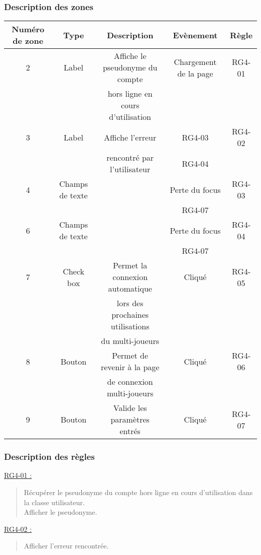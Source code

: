 \documentclass{report}
\begin{document}
		\subsubsection{Description des zones}
		
			\begin{tabular}{|c|c|c|c|c|} \hline
				Numéro de zone & Type  & Description & Evènement &	Règle \\\hline
				2 & Label & Affiche le pseudonyme du compte & Chargement de la page & RG4-01 \\
				  &       & hors ligne en cours d'utilisation & & \\\hline
				3 & Label & Affiche l'erreur & RG4-03 & RG4-02 \\
				  &       & rencontré par l'utilisateur & RG4-04 & \\\hline
				4 & Champs de texte & & Perte du focus & RG4-03 \\
				 & & & RG4-07 & \\\hline 
				6 & Champs de texte & & Perte du focus & RG4-04 \\
				 & & & RG4-07 & \\\hline 
				7 & Check box & Permet la connexion automatique & Cliqué & RG4-05 \\
				  &           & lors des prochaines utilisations&        & \\				
				  &           & du multi-joueurs                &        & \\\hline
				8 & Bouton & Permet de revenir à la page & Cliqué & RG4-06 \\
				  &        & de connexion multi-joueurs \footnotemark[1] & & \\\hline
				9 & Bouton & Valide les paramètres entrés & Cliqué & RG4-07 \\\hline
			\end{tabular}
			
		\subsubsection{Description des règles}

			\underline{RG4-01 :}
				\begin{quote}
					Récupérer le pseudonyme du compte hors ligne en cours d'utilisation dans la classe utilisateur.\\
					Afficher le pseudonyme.\\
				\end{quote}

			\underline{RG4-02 :}
				\begin{quote}
					Afficher l'erreur rencontrée.\\
				\end{quote}
				
\end{document}
